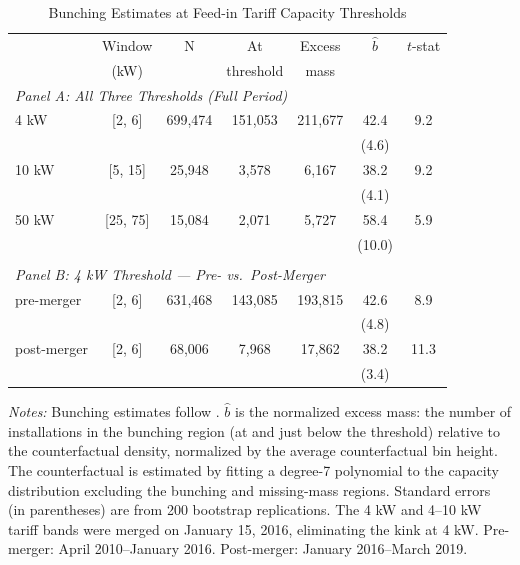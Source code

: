 \begin{table}[t]
\centering
\caption{Bunching Estimates at Feed-in Tariff Capacity Thresholds}
\label{tab:bunching}
\begin{tabular}{lcccccc}
\toprule
 & Window & N & At & Excess & $\hat{b}$ & $t$-stat \\
 & (kW) & & threshold & mass & & \\
\midrule
\multicolumn{7}{l}{\textit{Panel A: All Three Thresholds (Full Period)}} \\
4 kW & [2, 6] & 699,474 & 151,053 & 211,677 & 42.4 & 9.2 \\
 & & & & & (4.6) & \\
10 kW & [5, 15] & 25,948 & 3,578 & 6,167 & 38.2 & 9.2 \\
 & & & & & (4.1) & \\
50 kW & [25, 75] & 15,084 & 2,071 & 5,727 & 58.4 & 5.9 \\
 & & & & & (10.0) & \\
 & & & & & & \\
\multicolumn{7}{l}{\textit{Panel B: 4 kW Threshold --- Pre- vs.\ Post-Merger}} \\
pre-merger & [2, 6] & 631,468 & 143,085 & 193,815 & 42.6 & 8.9 \\
 & & & & & (4.8) & \\
post-merger & [2, 6] & 68,006 & 7,968 & 17,862 & 38.2 & 11.3 \\
 & & & & & (3.4) & \\
\bottomrule
\end{tabular}
\par\vspace{0.3em}\begin{flushleft}\small
\textit{Notes:} Bunching estimates follow \citet{kleven2013}. $\hat{b}$ is the normalized excess mass: the number of installations in the bunching region (at and just below the threshold) relative to the counterfactual density, normalized by the average counterfactual bin height. The counterfactual is estimated by fitting a degree-7 polynomial to the capacity distribution excluding the bunching and missing-mass regions. Standard errors (in parentheses) are from 200 bootstrap replications. The 4 kW and 4--10 kW tariff bands were merged on January 15, 2016, eliminating the kink at 4 kW. Pre-merger: April 2010--January 2016. Post-merger: January 2016--March 2019.
\end{flushleft}
\end{table}

